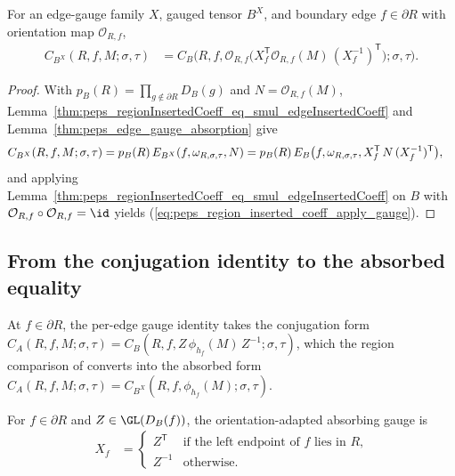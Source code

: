 \begin{lemma}%
    \label{thm:peps_regionInsertedCoeff_applyGauge}
    \leanok
    For an edge-gauge family $X$, gauged tensor $B^X$, and boundary edge $f\in\partial R$ with orientation map $\mathcal O_{R,f}$,
    \begin{align}
        C_{B^X}(R,f,M;\sigma,\tau)
         & =
        C_B\bigl(R,f,
        \mathcal O_{R,f}\bigl(X_f^{\mathsf T}
        \mathcal O_{R,f}(M)\,(X_f^{-1})^{\mathsf T}\bigr);
        \sigma,\tau\bigr).
        \label{eq:peps_region_inserted_coeff_apply_gauge}
    \end{align}
\end{lemma}
\begin{proof}\leanok
    With $p_B(R)=\prod_{g\notin\partial R}D_B(g)$ and $N=\mathcal O_{R,f}(M)$, Lemma~\ref{thm:peps_regionInsertedCoeff_eq_smul_edgeInsertedCoeff} and Lemma~\ref{thm:peps_edge_gauge_absorption} give
    \begin{align}
        C_{B^X}(R,f,M;\sigma,\tau)
         & =p_B(R)\,E_{B^X}(f,\omega_{R,\sigma,\tau},N)
        =p_B(R)\,E_B\bigl(f,\omega_{R,\sigma,\tau},X_f^{\mathsf T}\,N\,(X_f^{-1})^{\mathsf T}\bigr),
        \notag
    \end{align}
    and applying Lemma~\ref{thm:peps_regionInsertedCoeff_eq_smul_edgeInsertedCoeff} on $B$ with $\mathcal O_{R,f}\circ\mathcal O_{R,f}=\id$ yields (\ref{eq:peps_region_inserted_coeff_apply_gauge}).
\end{proof}

\subsection{From the conjugation identity to the absorbed equality}%
\label{subsec:peps_absorbed_equality}

At $f\in\partial R$, the per-edge gauge identity takes the conjugation form $C_A(R,f,M;\sigma,\tau)=C_B(R,f,Z\,\phi_{h_f}(M)\,Z^{-1};\sigma,\tau)$, which the region comparison of \cite[Section~3]{Molnar2018NormalPEPS} converts into the absorbed form $C_A(R,f,M;\sigma,\tau)=C_{B^X}(R,f,\phi_{h_f}(M);\sigma,\tau)$.

\begin{definition}%
    \label{def:peps_absorbedBoundaryGauge}
    \leanok
    For $f\in\partial R$ and $Z\in\GL(D_B(f))$, the orientation-adapted absorbing gauge is
    \begin{align}
        X_f
         & =
        \begin{cases}
            Z^{\mathsf T} & \text{if the left endpoint of $f$ lies in $R$,} \\
            Z^{-1}        & \text{otherwise.}
        \end{cases}
        \label{eq:peps_absorbed_boundary_gauge}
    \end{align}
\end{definition}

